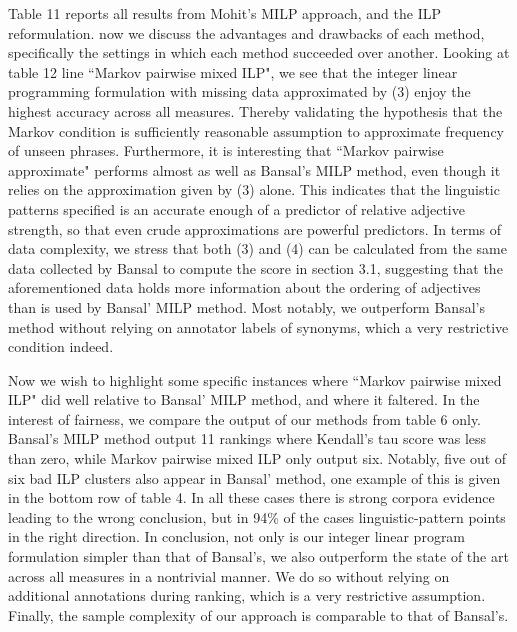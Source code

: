 Table 11 reports all results from Mohit's MILP approach, and the ILP reformulation. now we discuss the advantages and drawbacks of each method, specifically the settings in which each method succeeded over another. Looking at table 12 line ``Markov pairwise mixed ILP", we see that the integer linear programming formulation with missing data approximated by (3) enjoy the highest accuracy across all measures. Thereby validating the hypothesis that the Markov condition is sufficiently reasonable assumption to approximate frequency of unseen phrases. Furthermore, it is interesting that ``Markov pairwise approximate" performs almost as well as Bansal's MILP method, even though it relies on the approximation given by (3) alone. This indicates that the linguistic patterns specified is an accurate enough of a predictor of relative adjective strength, so that even crude approximations are powerful predictors. In terms of data complexity, we stress that both (3) and (4) can be calculated from the same data collected by Bansal to compute the score in section 3.1, suggesting that the aforementioned data holds more information about the ordering of adjectives than is used by Bansal' MILP method. Most notably, we outperform Bansal's method without relying on annotator labels of synonyms, which a very restrictive condition indeed.

Now we wish to highlight some specific instances where ``Markov pairwise mixed ILP" did well relative to Bansal' MILP method, and where it faltered. In the interest of fairness, we compare the output of our methods from table 6 only. Bansal's MILP method output 11 rankings where Kendall's tau score was less than zero, while  Markov pairwise mixed ILP only output six. Notably, five out of six bad ILP clusters also appear in Bansal' method, one example of this is given in the bottom row of table 4. In all these cases there is strong corpora evidence leading to the wrong conclusion, but in 94\% of the cases linguistic-pattern points in the right direction. In conclusion, not only is our integer linear program formulation simpler than that of Bansal's, we also outperform the state of the art across all measures in a nontrivial manner. We do so without relying on additional annotations during ranking, which is a very restrictive assumption. Finally, the sample complexity of our approach is comparable to that of Bansal's. 


